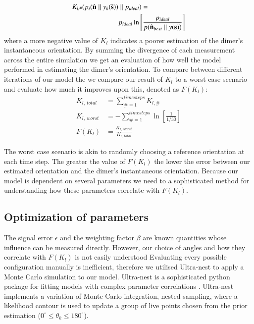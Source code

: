\documentclass[final, 3p]{elsarticle}
\begin{document}
\begin{align}
	K_{l, \#}(p_i(\hat{\bf n}\parallel y_k(\bar{\bf s})) &\parallel p_{ideal}) =\nonumber \\
	&p_{ideal}\ln \left[\frac{p_{ideal}}{p(\hat{\bf n}_{best}\parallel y(\bar{\bf s}))}
	\right]
\end{align}
where a more negative value of $K_l$ indicates a poorer estimation of
the dimer's instantaneous orientation. By summing the divergence of
each measurement across the entire simulation we get an evaluation of
how well the model performed in estimating the dimer's orientation. To
compare between different iterations of our model the we compare our
result of $K_l$ to a worst case scenario and evaluate how much it
improves upon this, denoted as $F(K_l)$:
\begin{align}
	K_{l, \ total} &= \sum\limits_{\# =1}^{timesteps} K_{l,\#} \\
	K_{l, \ worst} &= -\sum\limits_{\#=1}^{timesteps} \ln \left[\frac{1}{1/30} \right] \\
	F(K_l) &= \frac{K_{l,\ worst}}{K_{l, \ total}}
\end{align}

The worst case scenario is akin to randomly choosing a reference
orientation at each time step. The greater the value of $F(K_l)$ the
lower the error between our estimated orientation and the dimer's
instantaneous orientation. Because our model is dependent on several
parameters we need to a sophisticated method for understanding how
these parameters correlate with $F(K_l)$.


\subsection{Optimization of parameters}
\label{sec:2.4}
The signal error $\epsilon$ and the weighting factor $\beta$ are known quantities whose influence can be measured directly. However, our choice of angles and how they correlate with $F(K_l)$ is not easily understood Evaluating every possible configuration manually is inefficient, therefore we utilised Ultra-nest to apply a Monte Carlo simulation to our model. Ultra-nest is a sophisticated python package for fitting models with complex parameter correlations \cite{Buchner2016Ultranest}. Ultra-nest implements a variation of Monte Carlo integration, nested-sampling, where a likelihood contour is used to update a group of live points chosen from the prior estimation ($0^{\circ} \leq \theta_k \leq 180^{\circ}$).
\end{document}
